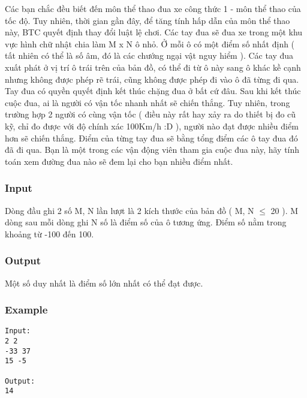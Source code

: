



   Các bạn chắc đều biết đến môn thể thao đua xe công thức 1 - môn thể thao của tốc độ. Tuy nhiên, thời gian gần đây, để tăng tính hấp dẫn của môn thể thao này, BTC quyết định thay đổi luật lệ chơi. Các tay đua sẽ đua xe trong một khu vực hình chữ nhật chia làm M x N ô nhỏ. Ở mỗi ô có một điểm số nhất định ( tất nhiên có thể là số âm, đó là các chướng ngại vật nguy hiểm ). Các tay đua xuất phát ở vị trí ô trái trên của bản đồ, có thể đi từ ô này sang ô khác kề cạnh nhưng không được phép rẽ trái, cũng không được phép đi vào ô đã từng đi qua. Tay đua có quyền quyết định kết thúc chặng đua ở bất cứ đâu. Sau khi kết thúc cuộc đua, ai là người có vận tốc nhanh nhất sẽ chiến thắng. Tuy nhiên, trong trường hợp 2 người có cùng vận tốc ( điều này rất hay xảy ra do thiết bị đo cũ kỹ, chỉ đo được với độ chính xác 100Km/h :D ), người nào đạt được nhiều điểm hơn sẽ chiến thắng. Điểm của từng tay đua sẽ bằng tổng điểm các ô tay đua đó đã đi qua. Bạn là một trong các vận động viên tham gia cuộc đua này, hãy tính toán xem đường đua nào sẽ đem lại cho bạn nhiều điểm nhất.  

\subsubsection{   Input  }

   Dòng đầu ghi 2 số M, N lần lượt là 2 kích thước của bản đồ ( M, N  $\le$  20 ). M dòng sau mỗi dòng ghi N số là điểm số của ô tương ứng. Điểm số nằm trong khoảng từ -100 đến 100.  

\subsubsection{   Output  }

   Một số duy nhất là điểm số lớn nhất có thể đạt được.  

\subsubsection{   Example  }
\begin{verbatim}
Input:
2 2
-33 37
15 -5

Output:
14
\end{verbatim}
